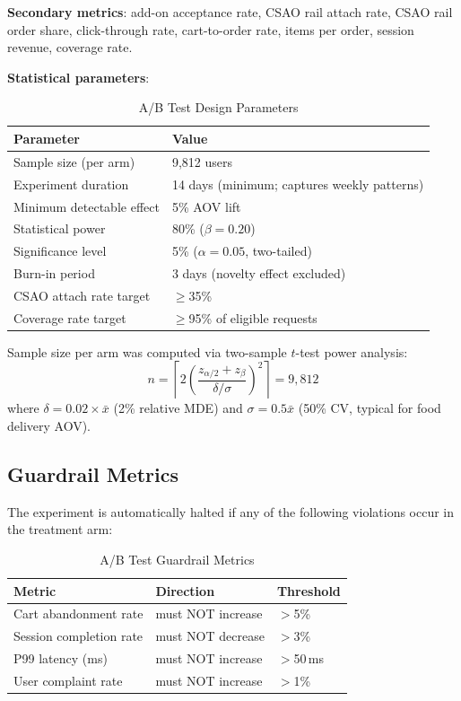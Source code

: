 \documentclass[conference]{IEEEtran}
\begin{document}
\textbf{Secondary metrics}: add-on acceptance rate, CSAO rail attach rate,
CSAO rail order share, click-through rate, cart-to-order rate,
items per order, session revenue, coverage rate.

\textbf{Statistical parameters}:

\begin{table}[h]
\caption{A/B Test Design Parameters}
\centering
\begin{tabular}{ll}
\toprule
Parameter & Value \\
\midrule
Sample size (per arm) & 9,812 users \\
Experiment duration    & 14 days (minimum; captures weekly patterns) \\
Minimum detectable effect & 5\% AOV lift \\
Statistical power      & 80\% ($\beta = 0.20$) \\
Significance level     & 5\% ($\alpha = 0.05$, two-tailed) \\
Burn-in period         & 3 days (novelty effect excluded) \\
CSAO attach rate target & $\geq$35\% \\
Coverage rate target    & $\geq$95\% of eligible requests \\
\bottomrule
\end{tabular}
\end{table}

Sample size per arm was computed via two-sample $t$-test power analysis:
\begin{equation}
  n = \left\lceil 2 \left( \frac{z_{\alpha/2} + z_\beta}{\delta / \sigma}
  \right)^2 \right\rceil = 9{,}812
\end{equation}
where $\delta = 0.02 \times \bar{x}$ (2\% relative MDE) and
$\sigma = 0.5\bar{x}$ (50\% CV, typical for food delivery AOV).

\subsection{Guardrail Metrics}

The experiment is automatically halted if any of the following violations
occur in the treatment arm:

\begin{table}[h]
\caption{A/B Test Guardrail Metrics}
\centering
\begin{tabular}{lll}
\toprule
Metric & Direction & Threshold \\
\midrule
Cart abandonment rate   & must NOT increase & $>$5\% \\
Session completion rate & must NOT decrease & $>$3\% \\
P99 latency (ms)        & must NOT increase & $>$50\,ms \\
User complaint rate     & must NOT increase & $>$1\% \\
\bottomrule
\end{tabular}
\end{table}
\end{document}
